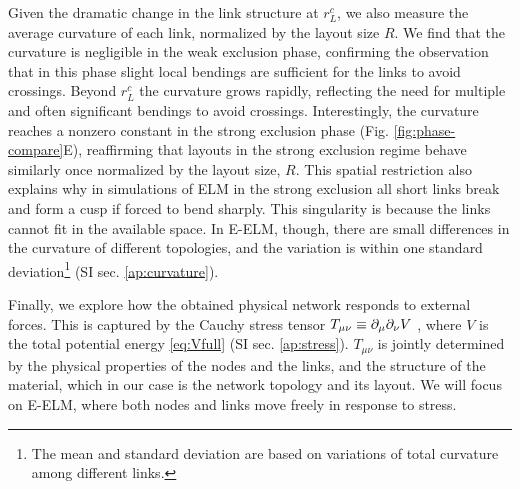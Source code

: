 \documentclass[nofootinbib,preprint,floatfix,titlepage,endfloats]{revtex4} %
\newcommand{\outNim}[1]{}
\begin{document}
Given the dramatic change in the link structure at $r^c_L$,
we also measure the average curvature of each link, normalized by the layout size $R$.  
We find that the curvature is negligible in the weak exclusion phase, confirming the observation that in this phase slight local bendings are sufficient for the links to avoid crossings. 
Beyond $r^c_L$ the curvature grows rapidly, reflecting the need for multiple and often significant bendings to avoid crossings. 
Interestingly, the curvature reaches a nonzero constant in the strong exclusion phase (Fig. \ref{fig:phase-compare}E), reaffirming that layouts in the strong exclusion regime behave similarly once normalized by the layout size, $R$.  
This spatial restriction also explains why in simulations of ELM in the strong exclusion all short links break and form a cusp if forced to bend sharply. 
This singularity is because the links cannot fit in the available space.
\outNim{In ELM, the 3D lattice shows a higher final curvature than BA and ER. 
This is because the underlying node layout faithfully reconstruct the lattice layout, putting connected nodes close to each other. Therefore, all lattice links have to bend sharply to reach the neighboring nodes in the strong exclusion phase. But in BA and ER will have some links that extend to farther nodes, taking a long path outside of the layout, with less curvature than in the lattice.
}%
In E-ELM, though, there are small differences in the curvature of different topologies, and the variation is within one standard deviation\footnote{The mean and standard deviation are based on variations of total curvature among different links. } (SI sec. \ref{ap:curvature}).  

%
Finally, we explore how the obtained physical network responds to external forces. 
This is captured by the Cauchy stress tensor $T_{\mu\nu} \equiv \partial_\mu\partial_\nu V$ \cite{irgens2008continuum}, where $V$ is the total potential energy \eqref{eq:Vfull} (SI sec. \ref{ap:stress}).
$T_{\mu\nu}$ is jointly determined by the physical properties of the nodes and the links, and the structure of the material, which in our case is the network topology and its layout. 
We will focus on E-ELM, where both nodes and links move freely in response to stress. 
\end{document}

